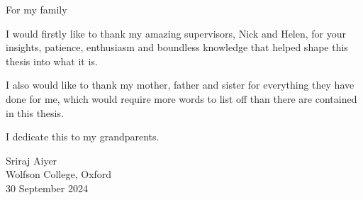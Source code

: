 \documentclass[a4paper, nobind]{templates/ociamthesis}
\begin{document}
\setcounter{secnumdepth}{2}
\setcounter{tocdepth}{1}



\begin{romanpages}

\maketitle

\begin{dedication}
  For my family
\end{dedication}



\begin{acknowledgements}
 	I would firstly like to thank my amazing supervisors, Nick and Helen, for your insights, patience, enthusiasm and boundless knowledge that helped shape this thesis into what it is.

 I also would like to thank my mother, father and sister for everything they have done for me, which would require more words to list off than there are contained in this thesis.

 I dedicate this to my grandparents.

 \begin{flushright}
 Sriraj Aiyer\\
 Wolfson College, Oxford \\
 30 September 2024
 \end{flushright}
\end{acknowledgements}






\end{romanpages}
\end{document}
